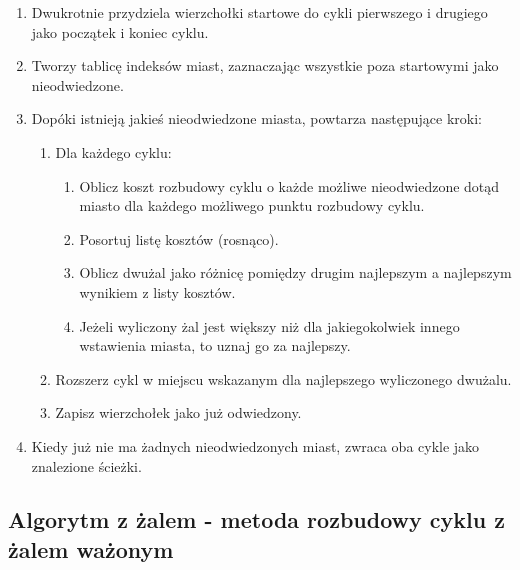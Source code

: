 \documentclass[11pt]{article}
\begin{document}
\begin{enumerate}
    \item Dwukrotnie przydziela wierzchołki startowe do cykli pierwszego i drugiego jako początek i koniec cyklu.
    \item Tworzy tablicę indeksów miast, zaznaczając wszystkie poza startowymi jako nieodwiedzone.
    \item Dopóki istnieją jakieś nieodwiedzone miasta, powtarza następujące kroki:
    \begin{enumerate}
        \item Dla każdego cyklu:
        \begin{enumerate}
            \item Oblicz koszt rozbudowy cyklu o każde możliwe nieodwiedzone dotąd miasto dla każdego możliwego punktu rozbudowy cyklu.
            \item Posortuj listę kosztów (rosnąco).
            \item Oblicz dwużal jako różnicę pomiędzy drugim najlepszym a najlepszym wynikiem z listy kosztów.
            \item Jeżeli wyliczony żal jest większy niż dla jakiegokolwiek innego wstawienia miasta, to uznaj go za najlepszy.
        \end{enumerate}
        \item Rozszerz cykl w miejscu wskazanym dla najlepszego wyliczonego dwużalu.
        \item Zapisz wierzchołek jako już odwiedzony.
    \end{enumerate}
    \item Kiedy już nie ma żadnych nieodwiedzonych miast, zwraca oba cykle jako znalezione ścieżki.
\end{enumerate}


\subsection{Algorytm z żalem - metoda rozbudowy cyklu z żalem ważonym}\label{subsec:algorytm-z-zalem---metoda-rozbudowy-cyklu-z-zalem-wazonym}
\end{document}
